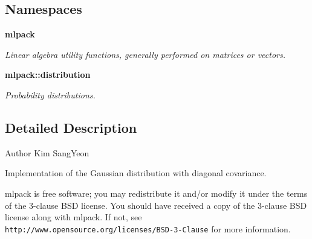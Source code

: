 \subsection*{Namespaces}
\begin{DoxyCompactItemize}
\item 
 \textbf{ mlpack}
\begin{DoxyCompactList}\small\item\em Linear algebra utility functions, generally performed on matrices or vectors. \end{DoxyCompactList}\item 
 \textbf{ mlpack\+::distribution}
\begin{DoxyCompactList}\small\item\em Probability distributions. \end{DoxyCompactList}\end{DoxyCompactItemize}


\subsection{Detailed Description}
\begin{DoxyAuthor}{Author}
Kim Sang\+Yeon
\end{DoxyAuthor}
Implementation of the Gaussian distribution with diagonal covariance.

mlpack is free software; you may redistribute it and/or modify it under the terms of the 3-\/clause B\+SD license. You should have received a copy of the 3-\/clause B\+SD license along with mlpack. If not, see {\tt http\+://www.\+opensource.\+org/licenses/\+B\+S\+D-\/3-\/\+Clause} for more information. 
